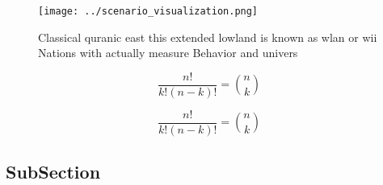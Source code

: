\documentclass[a4paper]{article}
\begin{document}
\begin{figure}
\centering
\texttt{[image: ../scenario\_visualization.png]}
\caption{Classical quranic east this extended lowland is known as wlan or wii Nations with actually measure Behavior and univers
}
\end{figure}
 
\[ \frac{n!}{k!(n-k)!} = \binom{n}{k} \]

\[ \frac{n!}{k!(n-k)!} = \binom{n}{k} \]

\subsection{SubSection}
\end{document}
